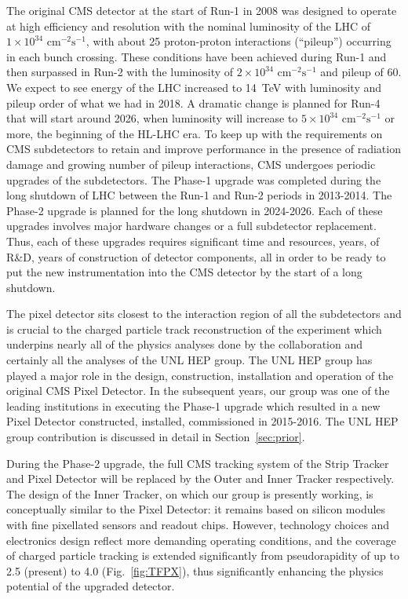 The original CMS detector at the start of Run-1 in 2008 was designed to operate at high efficiency and resolution with the nominal luminosity of the LHC of $1\times10^{34}\textrm{ cm}^{-2}\textrm{s}^{-1}$, with about 25 proton-proton interactions (``pileup'') occurring in each bunch crossing. These conditions have been achieved during Run-1 and then surpassed in Run-2 with the luminosity of $2\times10^{34}\textrm{ cm}^{-2}\textrm{s}^{-1}$ and pileup of 60. We expect to see energy of the LHC increased to 14~TeV with luminosity and pileup order of what we had in 2018. A dramatic change is planned for Run-4 that will start around 2026, when luminosity will increase to $5\times10^{34}\textrm{ cm}^{-2}\textrm{s}^{-1}$ or more, the beginning of the HL-LHC era. To keep up with the requirements on CMS subdetectors to retain and improve performance in the presence of radiation damage and growing number of pileup interactions, CMS undergoes periodic upgrades of the subdetectors. The Phase-1 upgrade was completed during the long shutdown of LHC between the Run-1 and Run-2 periods in 2013-2014. The Phase-2 upgrade is planned for the long shutdown in 2024-2026. Each of these upgrades involves major hardware changes or a full subdetector replacement. Thus, each of these upgrades requires significant time and resources, years, of R\&D, years of construction of detector components, all in order to be ready to put the new instrumentation into the CMS detector by the start of a long shutdown.

The pixel detector sits closest to the interaction region of all the subdetectors and is crucial to the charged particle track reconstruction of the experiment which underpins nearly all of the physics analyses done by the collaboration and certainly all the analyses of the UNL HEP group. The UNL HEP group has played a major role in the design, construction, installation and operation of the original CMS Pixel Detector. In the subsequent years, our group was one of the leading institutions in executing the Phase-1 upgrade which resulted in a new Pixel Detector constructed, installed, commissioned in 2015-2016. The UNL HEP group contribution is discussed in detail in Section~\ref{sec:prior}. 

During the Phase-2 upgrade, the full CMS tracking system of the Strip Tracker and Pixel Detector will be replaced by the Outer and Inner Tracker respectively. The design of the Inner Tracker, on which our group is presently working, is conceptually similar to the Pixel Detector: it remains based on silicon modules with fine pixellated sensors and readout chips. However, technology choices and electronics design reflect more demanding operating conditions, and the coverage of charged particle tracking is extended significantly from pseudorapidity of up to 2.5 (present) to 4.0 (Fig.~\ref{fig:TFPX}), thus significantly enhancing the physics potential of the upgraded detector. 


